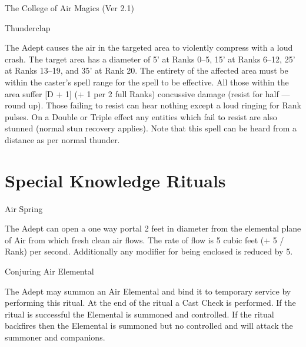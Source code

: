 \begin{Chapter}{The College of Air Magics (Ver 2.1)}
\begin{spell}[S-19]{Thunderclap}
\begin{effects}
The Adept causes the air in the targeted area to violently compress
with a loud crash.  The target area has a diameter of 5’ at Ranks 0–5,
15’ at Ranks 6–12, 25’ at Ranks 13–19, and 35’ at Rank 20.  The
entirety of the affected area must be within the caster’s spell range
for the spell to be effective.  All those within the area suffer [D +
  1] (+ 1 per 2 full Ranks) concussive damage (resist for half — round
up). Those failing to resist can hear nothing except a loud ringing
for Rank pulses. On a Double or Triple effect any entities which fail
to resist are also stunned (normal stun recovery applies).  Note that
this spell can be heard from a distance as per normal thunder.
\end{effects}
\end{spell}


\section{Special Knowledge Rituals}

\begin{ritual}[R-1]{Air Spring}

\begin{effects}
The Adept can open a one way portal 2 feet in diameter from the
elemental plane of Air from which fresh clean air flows. The rate of
flow is 5 cubic feet (+ 5 / Rank) per second.  Additionally any
modifier for being enclosed is reduced by 5.
\end{effects}
\end{ritual}

\begin{ritual}[R-2]{Conjuring Air Elemental}

\begin{effects}
The Adept may summon an Air Elemental and bind it to temporary service
by performing this ritual. At the end of the ritual a Cast Check is
performed.  If the ritual is successful the Elemental is summoned and
controlled.  If the ritual backfires then the Elemental is summoned
but no controlled and will attack the summoner and companions.


\end{effects}
\end{ritual}
\end{Chapter}
